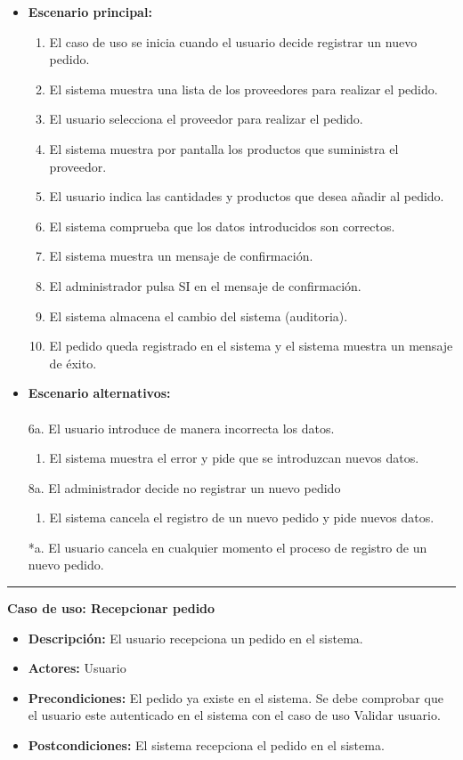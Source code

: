 \begin{itemize}\renewcommand{\labelitemi}{$\circ$}
 \item \textbf{Escenario principal:}
         \begin{enumerate}
          \item El caso de uso se inicia cuando el usuario decide registrar un nuevo pedido.
          \item El sistema muestra una lista de los proveedores para realizar el pedido.
          \item El usuario selecciona el proveedor para realizar el pedido.
         \item  El sistema muestra por pantalla los productos que suministra el proveedor.
          \item El usuario indica las cantidades y productos que desea añadir al pedido.
          \item El sistema comprueba que los datos introducidos son correctos. 
          \item El sistema muestra un mensaje de confirmación.
          \item El administrador pulsa SI en el mensaje de confirmación.
 	  \item El sistema almacena el cambio del sistema (auditoria).
          \item El pedido queda registrado en el sistema y el sistema muestra un mensaje de éxito.
         \end{enumerate}
  \item \textbf{Escenario alternativos:}\\\\
	6a. El usuario introduce de manera incorrecta los datos.
		\begin{enumerate}
		 \item El sistema muestra el error y pide que se introduzcan nuevos datos.
		\end{enumerate}
   	8a. El administrador decide no registrar un nuevo pedido
	      \begin{enumerate}
	       \item El sistema cancela el registro de un nuevo pedido y pide nuevos datos.
	      \end{enumerate}
          *a. El usuario cancela en cualquier momento el proceso de registro de un nuevo pedido.
\end{itemize}
\smallskip
\hrule height 1pt
\smallskip
\textbf{Caso de uso: Recepcionar pedido}
\begin{itemize}\renewcommand{\labelitemi}{$\cdot$}
 \item \textbf{Descripción:} El usuario recepciona un pedido en el sistema.
  \item \textbf{Actores:} Usuario
  \item \textbf{Precondiciones:} El pedido ya existe en el sistema. Se debe comprobar que el usuario este autenticado en el sistema con el caso de uso Validar usuario.
  \item \textbf{Postcondiciones:} El sistema recepciona el pedido en el sistema.
\end{itemize}
